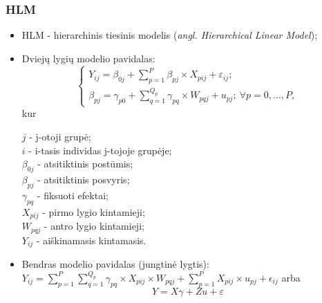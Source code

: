 \documentclass[utf8,hyperref={unicode,pdftex}]{beamer}
\begin{document}
\begin{frame}
\frametitle{HLM}
\begin{itemize}
\item HLM - hierarchinis tiesinis modelis (\textit{angl. Hierarchical Linear Model});
\item Dviejų lygių modelio pavidalas: 
\[ \left\{
  \begin{array}{l}
    Y_{ij} = \beta_{0j}+\sum^P_{p = 1} \beta_{pj}\times X_{pij}+\varepsilon_{ij}; \\
    \beta_{pj} = \gamma_{p0} + \sum^{Q_p}_{q=1}\gamma_{pq}\times W_{pqj}+u_{pj};\ \forall p = 0 , \dots, P,
  \end{array} \right.\]
kur\\
\begin{scriptsize}
$j$ - j-otoji grupė;\\
$i$ - i-tasis individas j-tojoje grupėje;\\
$\beta_{0j}$ - atsitiktinis postūmis;\\
$\beta_{pj}$ - atsitiktinis posvyris;\\
$\gamma_{pq}$ - fiksuoti efektai;\\
$X_{pij}$ - pirmo lygio kintamieji;\\
$W_{pqj}$ - antro lygio kintamieji;\\
$Y_{ij}$ - aiškinamasis kintamasis.
\end{scriptsize}
\small
\item Bendras modelio pavidalas (jungtinė lygtis): $ Y_{ij} =\sum^P_{p = 1} \sum^{Q_p}_{q=1}\gamma_{pq}\times X_{pij}\times W_{pqj}+\sum^P_{p = 1} X_{pij}\times u_{pj}+\epsilon_{ij}$ arba
\begin{equation*}
Y=X\gamma+Zu+\varepsilon
\end{equation*}
\end{itemize}
\end{frame}
\end{document}
